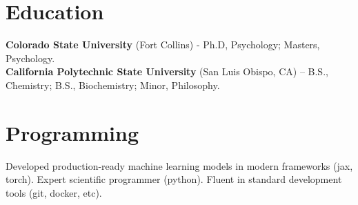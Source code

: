 \documentclass[margin,line]{res}
\begin{document}
\begin{resume}
\vspace{-.25cm}
\section{\sc Education}
{\bf Colorado State University} (Fort Collins) - Ph.D, Psychology; Masters, Psychology.\\

\vspace*{-.3in}
{\bf California Polytechnic State University} (San Luis Obispo, CA) -- B.S., Chemistry; B.S., Biochemistry; Minor, Philosophy.\\

\vspace{-.8cm}
\section{\sc Programming} Developed production-ready machine learning models in modern frameworks (jax, torch). Expert scientific programmer (python). Fluent in standard development tools (git, docker, etc).

    
\vspace{-.4cm} 

\end{resume}
\end{document}
